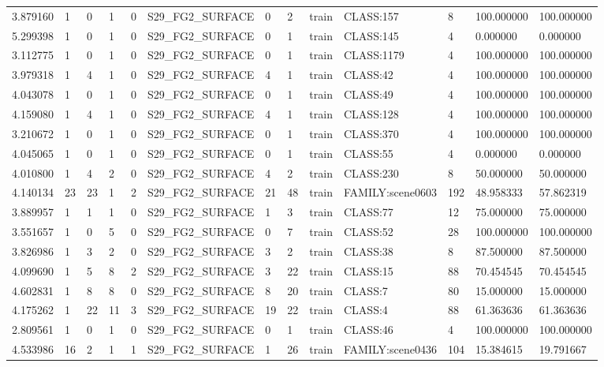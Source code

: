 \begin{tabular}{lllllllllllll}
3.879160 & 1 & 0 & 1 & 0 & S29\_FG2\_SURFACE & 0 & 2 & train & CLASS:157 & 8 & 100.000000 & 100.000000 \\
5.299398 & 1 & 0 & 1 & 0 & S29\_FG2\_SURFACE & 0 & 1 & train & CLASS:145 & 4 & 0.000000 & 0.000000 \\
3.112775 & 1 & 0 & 1 & 0 & S29\_FG2\_SURFACE & 0 & 1 & train & CLASS:1179 & 4 & 100.000000 & 100.000000 \\
3.979318 & 1 & 4 & 1 & 0 & S29\_FG2\_SURFACE & 4 & 1 & train & CLASS:42 & 4 & 100.000000 & 100.000000 \\
4.043078 & 1 & 0 & 1 & 0 & S29\_FG2\_SURFACE & 0 & 1 & train & CLASS:49 & 4 & 100.000000 & 100.000000 \\
4.159080 & 1 & 4 & 1 & 0 & S29\_FG2\_SURFACE & 4 & 1 & train & CLASS:128 & 4 & 100.000000 & 100.000000 \\
3.210672 & 1 & 0 & 1 & 0 & S29\_FG2\_SURFACE & 0 & 1 & train & CLASS:370 & 4 & 100.000000 & 100.000000 \\
4.045065 & 1 & 0 & 1 & 0 & S29\_FG2\_SURFACE & 0 & 1 & train & CLASS:55 & 4 & 0.000000 & 0.000000 \\
4.010800 & 1 & 4 & 2 & 0 & S29\_FG2\_SURFACE & 4 & 2 & train & CLASS:230 & 8 & 50.000000 & 50.000000 \\
4.140134 & 23 & 23 & 1 & 2 & S29\_FG2\_SURFACE & 21 & 48 & train & FAMILY:scene0603 & 192 & 48.958333 & 57.862319 \\
3.889957 & 1 & 1 & 1 & 0 & S29\_FG2\_SURFACE & 1 & 3 & train & CLASS:77 & 12 & 75.000000 & 75.000000 \\
3.551657 & 1 & 0 & 5 & 0 & S29\_FG2\_SURFACE & 0 & 7 & train & CLASS:52 & 28 & 100.000000 & 100.000000 \\
3.826986 & 1 & 3 & 2 & 0 & S29\_FG2\_SURFACE & 3 & 2 & train & CLASS:38 & 8 & 87.500000 & 87.500000 \\
4.099690 & 1 & 5 & 8 & 2 & S29\_FG2\_SURFACE & 3 & 22 & train & CLASS:15 & 88 & 70.454545 & 70.454545 \\
4.602831 & 1 & 8 & 8 & 0 & S29\_FG2\_SURFACE & 8 & 20 & train & CLASS:7 & 80 & 15.000000 & 15.000000 \\
4.175262 & 1 & 22 & 11 & 3 & S29\_FG2\_SURFACE & 19 & 22 & train & CLASS:4 & 88 & 61.363636 & 61.363636 \\
2.809561 & 1 & 0 & 1 & 0 & S29\_FG2\_SURFACE & 0 & 1 & train & CLASS:46 & 4 & 100.000000 & 100.000000 \\
4.533986 & 16 & 2 & 1 & 1 & S29\_FG2\_SURFACE & 1 & 26 & train & FAMILY:scene0436 & 104 & 15.384615 & 19.791667 \\

\end{tabular}
